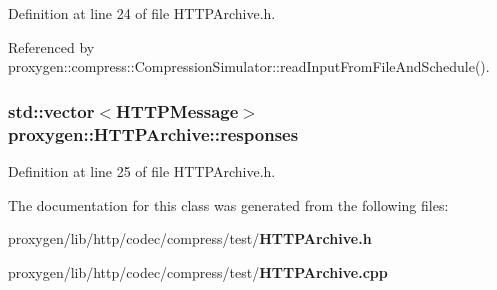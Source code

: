 Definition at line 24 of file H\+T\+T\+P\+Archive.\+h.



Referenced by proxygen\+::compress\+::\+Compression\+Simulator\+::read\+Input\+From\+File\+And\+Schedule().

\subsubsection[{responses}]{\setlength{\rightskip}{0pt plus 5cm}std\+::vector$<${\bf H\+T\+T\+P\+Message}$>$ proxygen\+::\+H\+T\+T\+P\+Archive\+::responses}\label{classproxygen_1_1HTTPArchive_a1c188d9d4b0980f48f5d981538f38aa3}


Definition at line 25 of file H\+T\+T\+P\+Archive.\+h.



The documentation for this class was generated from the following files\+:\begin{DoxyCompactItemize}
\item 
proxygen/lib/http/codec/compress/test/{\bf H\+T\+T\+P\+Archive.\+h}\item 
proxygen/lib/http/codec/compress/test/{\bf H\+T\+T\+P\+Archive.\+cpp}\end{DoxyCompactItemize}
